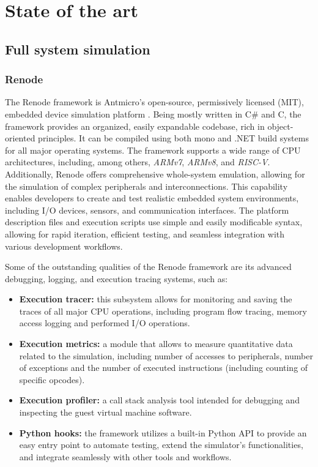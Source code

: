 
\chapter{State of the art}

\section{Full system simulation}

\subsection{Renode}

The Renode framework is Antmicro’s open-source, permissively licensed (MIT), embedded device simulation platform \cite{Renode}. Being mostly written in C\# and C, the framework provides an organized,
easily expandable codebase, rich in object-oriented principles. It can be compiled using both mono and .NET build systems for all major operating systems.
The framework supports a wide range of CPU architectures, including, among others, \textit{ARMv7}, \textit{ARMv8}, and \textit{RISC-V}.
Additionally, Renode offers comprehensive whole-system emulation, allowing for the simulation of complex peripherals and interconnections. This capability enables developers to
create and test realistic embedded system environments, including I/O devices, sensors, and communication interfaces. The platform description files and execution scripts
use simple and easily modificable syntax, allowing for rapid iteration, efficient testing, and seamless integration with various development workflows.

Some of the outstanding qualities of the Renode framework are its advanced debugging, logging, and execution tracing systems, such as:
\begin{itemize}
	\item \textbf{Execution tracer:} this subsystem allows for monitoring and saving the traces of all major CPU operations, including program flow tracing, memory access logging and
		performed I/O operations.
	\item \textbf{Execution metrics:} a module that allows to measure quantitative data related to the simulation, including number of accesses to peripherals, number of exceptions and
		the number of executed instructions (including counting of specific opcodes).
	\item \textbf{Execution profiler:} a call stack analysis tool intended for debugging and inspecting the guest virtual machine software.
	\item \textbf{Python hooks:} the framework utilizes a built-in Python API to provide an easy entry point to automate testing, extend the simulator's functionalities, and integrate
		seamlessly with other tools and workflows.
\end{itemize}

